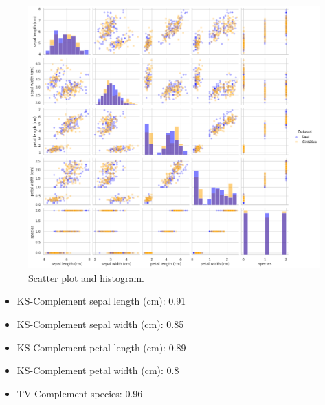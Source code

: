 \begin{figure}[H]
    \centering
    \includegraphics*[scale=.3]{figures/4-Advanced_Strategies/pairplot-Dataset2.png}
    \caption{Scatter plot and histogram.}
\end{figure}

\begin{itemize}
    \item KS-Complement sepal length (cm): 0.91
    \item KS-Complement sepal width (cm): 0.85
    \item KS-Complement petal length (cm): 0.89
    \item KS-Complement petal width (cm): 0.8
    \item TV-Complement species: 0.96
\end{itemize}

